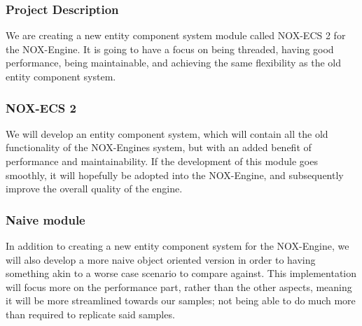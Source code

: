 \subsubsection{Project Description}
We are creating a new entity component system module called NOX-ECS 2 for the NOX-Engine. 
It is going to have a focus on being threaded, having good performance, being maintainable, and achieving the same flexibility as the old entity component system.

\subsubsection*{NOX-ECS 2}
We will develop an entity component system, which will contain all the old functionality of the NOX-Engines system, but with an added benefit of performance and maintainability. 
If the development of this module goes smoothly, it will hopefully be adopted into the NOX-Engine, and subsequently improve the overall quality of the engine.

\subsubsection*{Naive module}
In addition to creating a new entity component system for the NOX-Engine, we will also develop a more naive object oriented version in order to having something akin to a worse case scenario to compare against. 
This implementation will focus more on the performance part, rather than the other aspects, meaning it will be more streamlined towards our samples; 
not being able to do much more than required to replicate said samples.